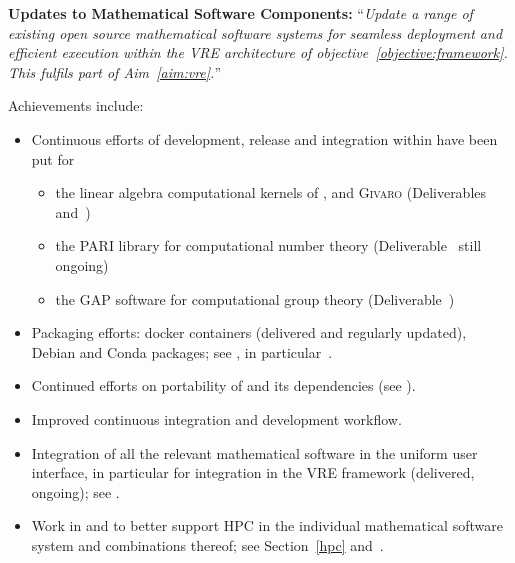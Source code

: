 \begin{compactenum}[\bf {Obj} 1\rm]
\item \label{objective:updates}
  \textbf{Updates to Mathematical Software Components:}
  ``\emph{Update a range of existing open source
  mathematical software systems for seamless deployment and efficient
  execution within the VRE architecture of objective~\ref{objective:framework}.
  This fulfils part of Aim~\ref{aim:vre}.}''


  Achievements include:
  \begin{itemize}
  \item Continuous efforts of development, release and integration within \SageMath
    have been put for
    \begin{itemize}
    \item  the linear algebra computational kernels of \Linbox,
      \fflasffpack and \textsc{Givaro} (Deliverables~ and~)
    \item the PARI library for computational number theory
      (Deliverable~ still ongoing)
    \item the GAP software for computational group theory
      (Deliverable~)
    \end{itemize}
  \item Packaging efforts: docker containers (delivered and regularly
    updated), Debian and Conda packages; see
    , in
    particular~.
  \item Continued efforts on portability of \SageMath and its dependencies
    (see ).
  \item Improved continuous integration and development workflow.
  \item Integration of all the relevant mathematical software in the
    uniform \Jupyter user interface, in particular for integration in
    the VRE framework (delivered, ongoing); see
    .
  \item Work in  and  to better support HPC in the
    individual mathematical software system and combinations thereof;
    see Section~\ref{hpc} and~.

\end{itemize}
\end{compactenum}

